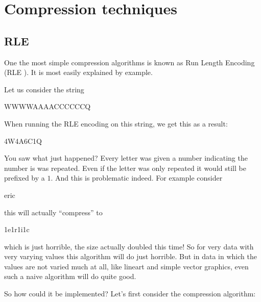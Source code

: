 \begin{comment}
  
\end{comment}

\chapter{Compression techniques}
\label{cha:digital-image}

\begin{refsection}

\section{RLE}
\label{sec:rle}

One the most simple compression algorithms is known as Run Length
Encoding (RLE
). \cite{nagarajan11:_enhan_approac_run_lengt_encod_schem}
It is most easily explained by example.

Let us consider the string

\begin{indentpar}
  WWWWAAAACCCCCCQ
\end{indentpar}

When running the RLE encoding on this string, we get this as a result:

\begin{indentpar}
  4W4A6C1Q
\end{indentpar}

You saw what just happened? Every letter was given a number indicating
the number is was repeated. Even if the letter was only repeated it
would still be prefixed by a $1$. And this is problematic indeed. For
example consider

\begin{indentpar}
  eric
\end{indentpar}

this will actually ``compress'' to

\begin{indentpar}
  1e1r1i1c
\end{indentpar}

which is just horrible, the size actually doubled this time! So for
very data with very varying values this algorithm will do just
horrible. But in data in which the values are not varied much at all,
like lineart and simple vector graphics, even such a naive algorithm
will do quite good.

So how could it be implemented? Let's first consider the compression algorithm:


\end{refsection}
